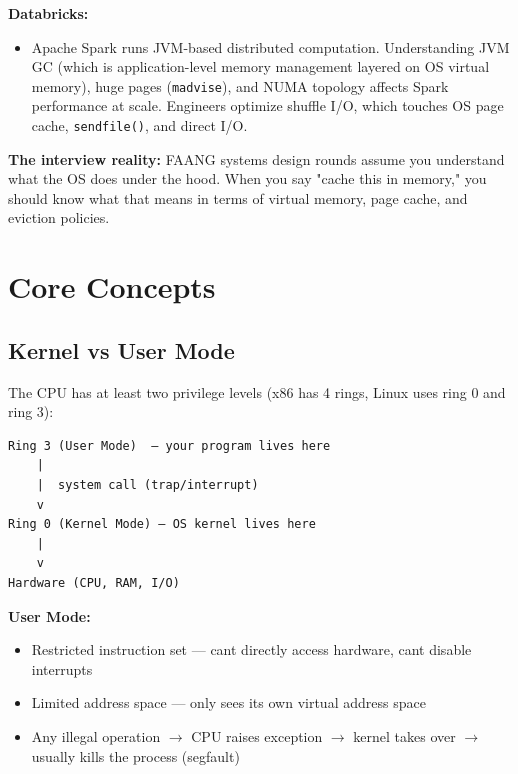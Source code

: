 \documentclass[11pt]{article}
\providecommand{\tightlist}{\setlength{\itemsep}{1pt}\setlength{\parskip}{0pt}}
\begin{document}
\textbf{Databricks:}

\begin{itemize}
\tightlist
\item
  Apache Spark runs JVM-based distributed computation. Understanding JVM GC (which is application-level memory management layered on OS virtual memory), huge pages (\texttt{madvise}), and NUMA topology affects Spark performance at scale. Engineers optimize shuffle I/O, which touches OS page cache, \texttt{sendfile()}, and direct I/O.
\end{itemize}

\textbf{The interview reality:} FAANG systems design rounds assume you understand what the OS does under the hood. When you say "cache this in memory," you should know what that means in terms of virtual memory, page cache, and eviction policies.

\section{Core Concepts}\label{core-concepts}

\subsection{Kernel vs User Mode}\label{kernel-vs-user-mode}

The CPU has at least two privilege levels (x86 has 4 rings, Linux uses ring 0 and ring 3):

\setcodelang{}

\begin{verbatim}
Ring 3 (User Mode)  — your program lives here
    |
    |  system call (trap/interrupt)
    v
Ring 0 (Kernel Mode) — OS kernel lives here
    |
    v
Hardware (CPU, RAM, I/O)
\end{verbatim}

\textbf{User Mode:}

\begin{itemize}
\tightlist
\item
  Restricted instruction set --- can\textquotesingle t directly access hardware, can\textquotesingle t disable interrupts
\item
  Limited address space --- only sees its own virtual address space
\item
  Any illegal operation \(\rightarrow\) CPU raises exception \(\rightarrow\) kernel takes over \(\rightarrow\) usually kills the process (segfault)
\end{itemize}
\end{document}
